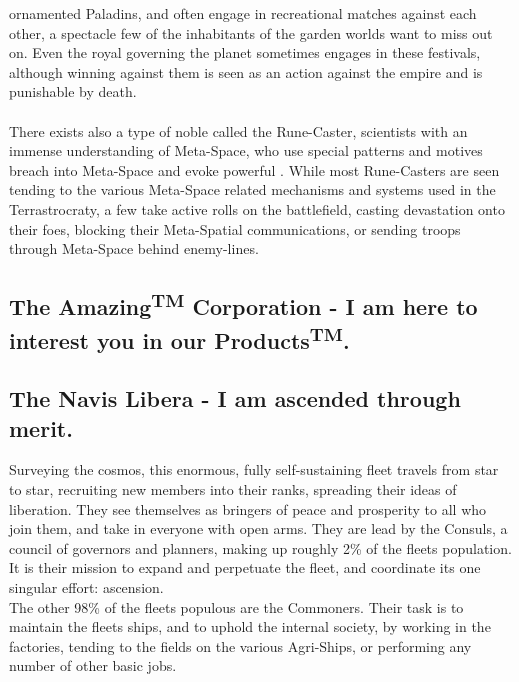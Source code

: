 \documentclass[a4paper,12pt]{report}
\begin{document}
ornamented Paladins, and often engage in recreational matches against each other, a spectacle few of the inhabitants of the garden worlds want to miss out on. Even the royal governing the planet sometimes engages in these festivals, although winning against them is seen as an action against the empire and is punishable by death.\\
\\
There exists also a type of noble called the Rune-Caster, scientists with an immense understanding of Meta-Space, who use special patterns and motives breach into Meta-Space and evoke powerful . While most Rune-Casters are seen tending to the various Meta-Space related mechanisms and systems used in the Terrastrocraty, a few take active rolls on the battlefield, casting devastation onto their foes, blocking their Meta-Spatial communications, or sending troops through Meta-Space behind enemy-lines.

\pagebreak


\subsection{The Amazing\textsuperscript{TM} Corporation - I am here to interest you in our Products\textsuperscript{TM}.}

\subsection{The Navis Libera - I am ascended through merit.}
Surveying the cosmos, this enormous, fully self-sustaining fleet travels from star to star, recruiting new members into their ranks, spreading their ideas of liberation. They see themselves as bringers of peace and prosperity to all who join them, and take in everyone with open arms. They are lead by the Consuls, a council of governors and planners, making up roughly 2\% of the fleets population. It is their mission to expand and perpetuate the fleet, and coordinate its one singular effort: ascension.\\
The other 98\% of the fleets populous are the Commoners. Their task is to maintain the fleets ships, and to uphold the internal society, by working in the factories, tending to the fields on the various Agri-Ships, or performing any number of other basic jobs. 
\end{document}
